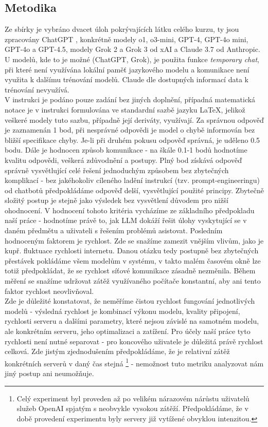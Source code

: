 \documentclass[czech,11pt,a4paper]{article}
\begin{document}
\begin{multicols}{2}
		\section{Metodika}
		Ze sbírky \cite{cviceni} je vybráno dvacet úloh pokrývajících látku celého kurzu, ty jsou zpracovány ChatGPT \cite{ChatGPT}, konkrétně modely o1, o3-mini, GPT-4, GPT-4o mini, GPT-4o a GPT-4.5, modely Grok 2 a Grok 3 od xAI\cite{Grok} a Claude 3.7 od Anthropic\cite{Claude}. U modelů, kde to je možné (ChatGPT, Grok), je použita funkce \textit{temporary chat}, při které není využívána lokální paměť jazykového modelu a komunikace není využita k dalšímu trénování modelů. Claude dle dostupných informací data k trénování nevyužívá\cite{anthropicprivacy}. \\V instrukci je podáno pouze zadání bez jiných doplnění, případná matematická notace je v instrukci formulována ve standardní sazbě jazyku LaTeX, jelikož veškeré modely tuto sazbu, případně její deriváty, využívají. Za správnou odpověď je zaznamenán 1 bod, při nesprávné odpovědi je model o chybě informován bez bližší specifikace chyby. Je-li při druhém pokusu odpověď správná, je uděleno 0.5 bodu. Dále je hodnocen způsob komunikace - na škále 0.1-1 bodů hodnotíme kvalitu odpovědi, veškerá zdůvodnění a postupy. Plný bod získává odpověď správně vysvětlující celé řešení jednoduchým způsobem bez zbytečných komplikací - bez jakéhokoliv cíleného ladění instrukcí (tzv. prompt-engineeringu) od chatbotů předpokládáme odpověď delší, vysvětlující použité principy. Zbytečně složitý postup je stejně jako výsledek bez vysvětlení důvodem pro nižší ohodnocení. V hodnocení tohoto kritéria vycházíme ze základního předpokladu naší práce - hodnotíme právě to, jak LLM dokáží řešit úlohy vyskytující se v daném předmětu a uživateli s řešením problémů asistovat. Posledním hodnoceným faktorem je rychlost. Zde se snažíme zamezit vnějším vlivům, jako je kupř. fluktuace rychlosti internetu. Danou otázku tedy postupně bez zbytečných přestávek pokládáme všem modelům v systému, v takto malém časovém okně lze totiž předpokládat, že se rychlost síťové komunikace zásadně nezměnila. Během měření se snažíme udržovat zátěž využívaného počítače konstantní, aby ani tento faktor rychlost neovlivňoval. \\
		Zde je důležité konstatovat, že neměříme čistou rychlost fungování jednotlivých modelů - výsledná rychlost je kombinací výkonu modelu, kvality připojení, rychlosti serveru a dalšími parametry, které nejsou závislé na samotném modelu, ale konkrétním serveru, jeho optimalizaci a zatížení. Pro účely naší práce tyto rychlosti není nutné separovat - pro koncového uživatele je důležitá právě rychlost celková. Zde jistým zjednodušením předpokládáme, že je relativní zátěž konkrétních serverů v daný čas stejná \footnote{Celý experiment byl proveden až po velikém nárazovém nárůstu uživatelů služeb OpenAI spjatým s neobvykle vysokou zátěží\cite{ET2025ghibli}. Předpokládáme, že v době provedení experimentu byly servery již vytížené obvyklou intenzitou.} - nemožnost tuto metriku analyzovat nám jiný postup ani neumožňuje.
		\newpage

\end{multicols}
\end{document}

